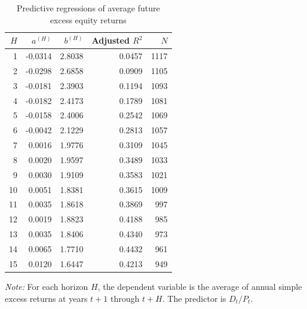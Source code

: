 \begin{table}[htbp]
\centering
\caption{Predictive regressions of average future excess equity returns}
\label{tab:q2a_results}
\begin{tabular}{rrrrr}
\toprule
$H$ & $a^{(H)}$ & $b^{(H)}$ & Adjusted $R^2$ & $N$ \\
\midrule
1 & -0.0314 & 2.8038 & 0.0457 & 1117 \\
2 & -0.0298 & 2.6858 & 0.0909 & 1105 \\
3 & -0.0181 & 2.3903 & 0.1194 & 1093 \\
4 & -0.0182 & 2.4173 & 0.1789 & 1081 \\
5 & -0.0158 & 2.4006 & 0.2542 & 1069 \\
6 & -0.0042 & 2.1229 & 0.2813 & 1057 \\
7 & 0.0016 & 1.9776 & 0.3109 & 1045 \\
8 & 0.0020 & 1.9597 & 0.3489 & 1033 \\
9 & 0.0030 & 1.9109 & 0.3583 & 1021 \\
10 & 0.0051 & 1.8381 & 0.3615 & 1009 \\
11 & 0.0035 & 1.8618 & 0.3869 & 997 \\
12 & 0.0019 & 1.8823 & 0.4188 & 985 \\
13 & 0.0035 & 1.8406 & 0.4340 & 973 \\
14 & 0.0065 & 1.7710 & 0.4432 & 961 \\
15 & 0.0120 & 1.6447 & 0.4213 & 949 \\
\bottomrule
\end{tabular}
\begin{minipage}{0.92\textwidth}
\footnotesize\textit{Note:} For each horizon $H$, the dependent variable is the average of annual simple excess returns at years $t+1$ through $t+H$. The predictor is $D_t/P_t$.
\end{minipage}
\end{table}
